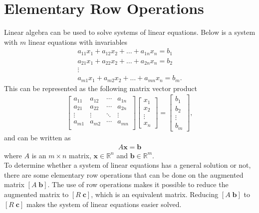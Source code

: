 \section{Elementary Row Operations}
Linear algebra can be used to solve systems of linear equations. Below is a system with $m$ linear equations with invariables
\begin{gather*}
    a_{11}x_1+a_{12}x_2+\hdots + a_{1n}x_n = b_1\\
    a_{21}x_1+a_{22}x_2+\hdots + a_{2n}x_n = b_2\\
    \vdots \\
    a_{m1}x_1+a_{m2}x_2+\hdots + a_{mn}x_n = b_m.
\end{gather*}
This can be represented as the following matrix vector product
\begin{align*}
    \begin{bmatrix}
    a_{1 1} & a_{1 2} & \cdots & a_{1 n}\\
    a_{2 1} & a_{2 2} & \cdots & a_{2 n}\\
    \vdots  &  \vdots & \ddots & \vdots \\
    a_{m 1} & a_{m 2} & \cdots & a_{m n}\\
    \end{bmatrix}
    \begin{bmatrix}
    x_1 \\ x_2 \\ \vdots \\ x_n
    \end{bmatrix}
    = \begin{bmatrix}
    b_1 \\ b_2 \\ \vdots \\ b_m
    \end{bmatrix},
\end{align*}
and can be written as 
\begin{align*}
    A\textbf{x}=\textbf{b}
\end{align*}
where $A$ is an $m\times n$ matrix, $\textbf{x} \in \mathbb{R}^n$ and $\textbf{b} \in \mathbb{R}^m$. \cite[27-28]{LiAl}\\
To determine whether a system of linear equations has a general solution or not, there are some elementary row operations that can be done on the augmented matrix $[A\;\textbf{b}]$. The use of row operations makes it possible to reduce the augmented matrix to $[R\;\textbf{c}]$, which is an equivalent matrix. Reducing $[A\;\textbf{b}]$ to $[R\;\textbf{c}]$ makes the system of linear equations easier solved.
